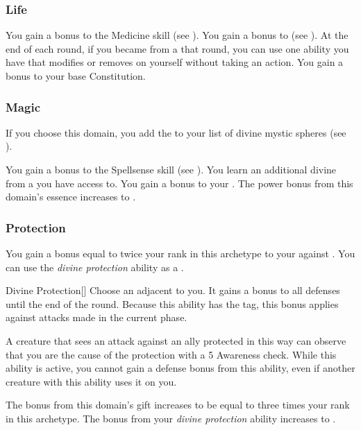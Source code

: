         \subsubsection{Life}
             You gain a  bonus to the Medicine skill (see ).
             You gain a  bonus to  (see ).
             At the end of each round, if you became  from a  that round, you can use one  ability you have that modifies  or removes  on yourself without taking an action.
             You gain a  bonus to your base Constitution.

        \subsubsection{Magic}
            If you choose this domain, you add the   to your list of divine mystic spheres (see ).

             You gain a  bonus to the Spellsense skill (see ).
             You learn an additional divine  from a  you have access to.
             You gain a  bonus to your  .
             The power bonus from this domain's essence increases to .

        \subsubsection{Protection}
             You gain a bonus equal to twice your rank in this archetype to your  against .
             You can use the \textit{divine protection} ability as a .
            \begin{freeability}{Divine Protection}[]
                Choose an  adjacent to you.
                It gains a  bonus to all defenses until the end of the round.
                Because this ability has the  tag, this bonus applies against attacks made in the current phase.

                A creature that sees an attack against an ally protected in this way can observe that you are the cause of the protection with a  5 Awareness check.
                While this ability is active, you cannot gain a defense bonus from this ability, even if another creature with this ability uses it on you.
            \end{freeability}
             The bonus from this domain's gift increases to be equal to three times your rank in this archetype.
             The bonus from your \textit{divine protection} ability increases to .

